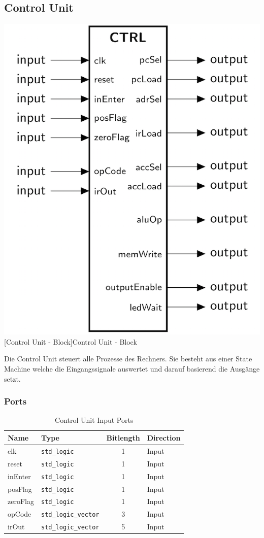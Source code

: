 \pagebreak
\subsection{Control Unit}

\vspace{1em}
\begin{minipage}{\linewidth}
    \centering
    \includegraphics[width=0.4\linewidth]{images/CTRL.png}
    [Control Unit - Block]{Control Unit - Block}
    \label{fig:ctrl_block}
\end{minipage}

Die Control Unit steuert alle Prozesse des Rechners. Sie besteht aus einer State Machine welche die Eingangssignale auswertet und darauf basierend die Ausgänge setzt.

\subsubsection{Ports}

\vspace{1em}
\begin{table}[!h]
	\centering
	\begin{tabular}{|l|l|c|l|}
		\hline
		\textbf{Name} & \textbf{Type} & \textbf{Bitlength} & \textbf{Direction}\\
		\hline
		clk & \texttt{std\_logic} & 1 & Input \\
		\hline
		reset & \texttt{std\_logic} & 1 & Input \\
		\hline
		inEnter & \texttt{std\_logic} & 1 & Input \\
		\hline
		posFlag & \texttt{std\_logic} & 1 & Input \\
		\hline
		zeroFlag & \texttt{std\_logic} & 1 & Input \\
		\hline
		opCode & \texttt{std\_logic\_vector} & 3 & Input \\
		\hline
		irOut & \texttt{std\_logic\_vector} & 5 & Input \\
		\hline
	\end{tabular}
	\caption{Control Unit Input Ports}
	\label{tab:ctrl_ports_in}
\end{table}


